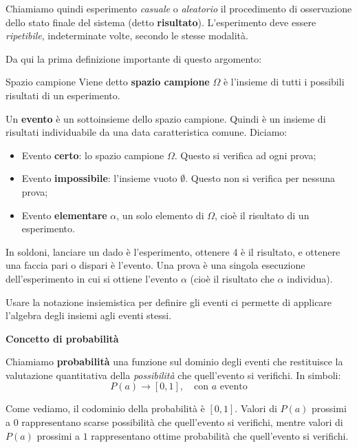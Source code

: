 \documentclass[a4paper,11pt]{article}
\begin{document}
Chiamiamo quindi esperimento \textit{casuale} o \textit{aleatorio} il procedimento di osservazione dello stato finale del sistema (detto \textbf{risultato}). L'esperimento deve essere \textit{ripetibile}, indeterminate volte, secondo le stesse modalità.

Da qui la prima definizione importante di questo argomento:
\begin{definition}{Spazio campione}
	Viene detto \textbf{spazio campione} $\Omega$ è l'insieme di tutti i possibili risultati di un esperimento.
\end{definition}

Un \textbf{evento} è un sottoinsieme dello spazio campione. Quindi è un insieme di risultati individuabile da una data caratteristica comune. Diciamo:
\begin{itemize}
	\item Evento \textbf{certo}: lo spazio campione $\Omega$. Questo si verifica ad ogni prova;
	\item Evento \textbf{impossibile}: l'insieme vuoto $\emptyset$. Questo non si verifica per nessuna prova;
	\item Evento \textbf{elementare} $\alpha$, un solo elemento di $\Omega$, cioè il risultato di un esperimento.
\end{itemize}

In soldoni, lanciare un dado è l'esperimento, ottenere 4 è il risultato, e ottenere una faccia pari o dispari è l'evento.
Una prova è una singola esecuzione dell'esperimento in cui si ottiene l'evento $\alpha$ (cioè il risultato che $\alpha$ individua).

Usare la notazione insiemistica per definire gli eventi ci permette di applicare l'algebra degli insiemi agli eventi stessi.

\par\smallskip

\noindent
\textbf{\textsf{Concetto di probabilità}}

\noindent
Chiamiamo \textbf{probabilità} una funzione sul dominio degli eventi che restituisce la valutazione quantitativa della \textit{possibilità} che quell'evento si verifichi.
In simboli:
$$
P(a) \rightarrow [0, 1], \quad \text{con $a$ evento}
$$

Come vediamo, il codominio della probabilità è $[0, 1]$. Valori di $P(a)$ prossimi a $0$ rappresentano scarse possibilità che quell'evento si verifichi, mentre valori di $P(a)$ prossimi a $1$ rappresentano ottime probabilità che quell'evento si verifichi.
\end{document}
